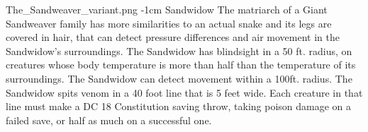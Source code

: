 \MonsterVariant{-1em}%
	{The_Sandweaver_variant.png}%
	{-1cm} %
	{Sandwidow}%
	{%
		The matriarch of a Giant Sandweaver family has more similarities to an actual snake and its legs are covered in hair, that can detect pressure differences and air movement in the Sandwidow's surroundings.
		 {\footnotesize {}}
		{\footnotesize The Sandwidow has blindsight in a 50 ft. radius, on creatures whose body temperature is more than half than the temperature of its surroundings.}
		{\footnotesize The Sandwidow can detect movement within a 100ft. radius.}
		{\footnotesize The Sandwidow spits venom in a 40 foot line that is 5 feet wide. Each creature in that line must make a DC 18 Constitution saving throw, taking  poison damage on a failed save, or half as much on a successful one.}
	}%
\vspace*{-1.5em}
